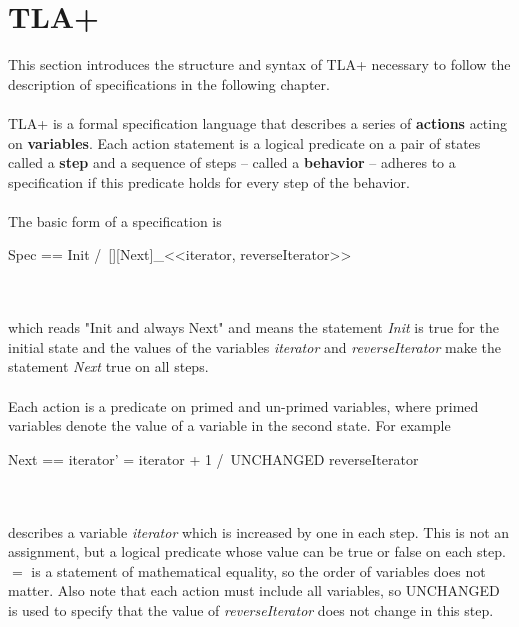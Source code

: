 \documentclass{uit-thesis}
\begin{document}
\section{TLA+}\label{sec:TLA+}
This section introduces the structure and syntax of TLA+ necessary to follow the description of specifications in the following chapter.
\\\\
TLA+ is a formal specification language that describes a series of \textbf{actions} acting on \textbf{variables}. Each action statement is a logical predicate on a pair of states called a \textbf{step} and a sequence of steps -- called a \textbf{behavior} -- adheres to a specification if this predicate holds for every step of the behavior.
\\\\
The basic form of a specification is
\begin{tla}
    Spec == Init /\ [][Next]_<<iterator, reverseIterator>>
\end{tla}
\begin{tlatex}
\end{tlatex}
\\\\
which reads "Init and always Next" and means the statement \textit{Init} is true for the initial state and the values of the variables \textit{iterator} and \textit{reverseIterator} make the statement \textit{Next} true on all steps.
\\\\
Each action is a predicate on primed and un-primed variables, where primed variables denote the value of a variable in the second state. For example
\begin{tla}
    Next == iterator' = iterator + 1 /\ UNCHANGED reverseIterator
\end{tla}
\begin{tlatex}
\end{tlatex}
\\\\
describes a variable \textit{iterator} which is increased by one in each step. This is not an assignment, but a logical predicate whose value can be true or false on each step. $=$ is a statement of mathematical equality, so the order of variables does not matter. Also note that each action must include all variables, so UNCHANGED is used to specify that the value of \textit{reverseIterator} does not change in this step.
\end{document}
